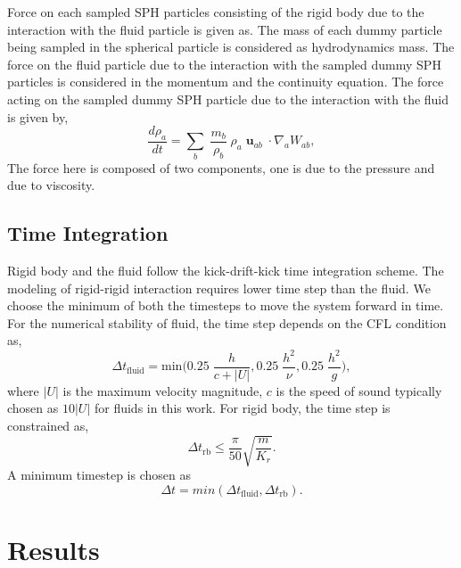 \documentclass[preprint,12pt]{elsarticle}
\newcommand{\ten}[1]{\ensuremath{\mathbf{#1}}}
\begin{document}
Force on each sampled SPH particles consisting of the rigid body due to the
interaction with the fluid particle is given as. The mass of each dummy
particle being sampled in the spherical particle is considered as
hydrodynamics mass. The force on the fluid particle due to the interaction
with the sampled dummy SPH particles is considered in the momentum and the
continuity equation. The force acting on the sampled dummy SPH particle due to
the interaction with the fluid is given by,
\begin{equation}
  \label{eq:sph-discretization-continuity}
  \frac{{d}\rho_a}{dt} = \sum_{b} \; \frac{m_b}{\rho_{b}} \;
  \rho_{a} \; {\ten{u}}_{ab} \; \cdot \nabla_{a} W_{ab},
\end{equation}
The force here is composed of two components, one is due to the pressure and
due to viscosity.



\FloatBarrier%
\subsection{Time Integration}

Rigid body and the fluid follow the kick-drift-kick time integration scheme. The
modeling of rigid-rigid interaction requires lower time step than the fluid. We
choose the minimum of both the timesteps to move the system forward in time. For
the numerical stability of fluid, the time step depends on the CFL condition as,
\begin{equation}
  \label{eq:rfc:time-step-cfl}
  \Delta t_{\text{fluid}} = \mathrm{min} \bigg( 0.25 \; \frac{h}{c + |U|} ,  0.25 \; \frac{h^2}{\nu},  0.25 \; \frac{h^2}{g} \bigg),
\end{equation}
where $|U|$ is the maximum velocity magnitude, $c$ is the speed of sound
typically chosen as $10 |U|$ for fluids in this work. For rigid body, the time
step is constrained as,
\begin{equation}
  \label{eq:rfc:time-step-body-force}
  \Delta t_{\text{rb}} \leq \frac{\pi}{50} \sqrt{\frac{m}{K_r}}.
\end{equation}
A minimum timestep is chosen as
\begin{equation}
  \label{eq:rfc:time-step-body-force}
  \Delta t = min(\Delta t_{\text{fluid}}, \Delta t_{\text{rb}}).
\end{equation}



\FloatBarrier%
\section{Results}
\label{sec:results}
\end{document}
